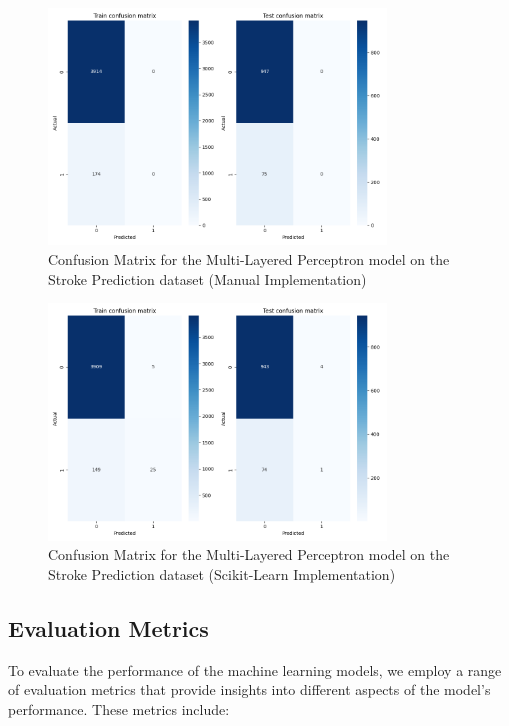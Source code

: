 \documentclass[runningheads]{paper}
\begin{document}
\begin{figure}[H]
    \centering
    \includegraphics[width=0.8\textwidth]{../tema2_AVC/MLP/confusion_matrix_manual.png}
    \caption{Confusion Matrix for the Multi-Layered Perceptron model on the Stroke Prediction dataset (Manual Implementation)}
    \label{fig:confusion_matrix_mlp_manual_stroke}
\end{figure}

\begin{figure}[H]
    \centering
    \includegraphics[width=0.8\textwidth]{../tema2_AVC/MLP/confusion_matrix_scikit-learn.png}
    \caption{Confusion Matrix for the Multi-Layered Perceptron model on the Stroke Prediction dataset (Scikit-Learn Implementation)}
    \label{fig:confusion_matrix_mlp_scikit_stroke}
\end{figure}

\subsection{Evaluation Metrics}
To evaluate the performance of the machine learning models, we employ a range of
evaluation metrics that provide insights into different aspects of the model's
performance. These metrics include:
\end{document}
